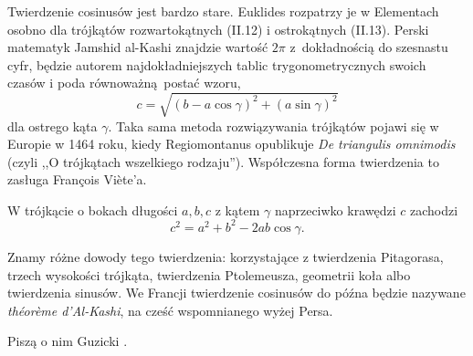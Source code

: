 Twierdzenie cosinusów jest bardzo stare.
Euklides rozpatrzy je w Elementach osobno dla trójkątów rozwartokątnych (II.12) i ostrokątnych (II.13).
Perski matematyk Jamshid al-Kashi znajdzie wartość $2\pi$ z~dokładnością do szesnastu cyfr, będzie autorem najdokładniejszych tablic trygonometrycznych swoich czasów i poda równoważną postać wzoru,
\begin{equation}
	c = \sqrt{(b - a \cos \gamma)^2 + (a \sin \gamma)^2}
\end{equation}
dla ostrego kąta $\gamma$.
Taka sama metoda rozwiązywania trójkątów pojawi się w Europie w 1464 roku, kiedy Regiomontanus opublikuje \emph{De triangulis omnimodis} (czyli ,,O trójkątach wszelkiego rodzaju'').
%
Współczesna forma twierdzenia to zasługa François Viète'a.
%

\begin{proposition}
	W trójkącie o bokach długości $a, b, c$ z kątem $\gamma$ naprzeciwko krawędzi $c$ zachodzi
	\label{twierdzenie_cosinusow}%
	\begin{equation}
		c^2 = a^2 + b^2 - 2ab \cos \gamma.
	\end{equation}
\end{proposition}

Znamy różne dowody tego twierdzenia: korzystające z twierdzenia Pitagorasa, trzech wysokości trójkąta, twierdzenia Ptolemeusza, geometrii koła albo twierdzenia sinusów.
We Francji twierdzenie cosinusów do późna będzie nazywane \emph{théorème d'Al-Kashi}, na cześć wspomnianego wyżej Persa.

Piszą o nim Guzicki \cite[s. 258]{guzicki_2021}.

